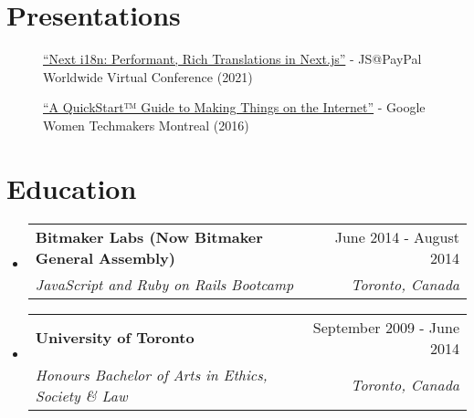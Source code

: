 \documentclass[letterpaper,10.8pt]{article}
\makeatletter
\newcommand{\education}[4]{
  \vspace{0pt}\item[]
    \begin{tabular*}{1\textwidth}{l@{\extracolsep{\fill}}r}
      \textbf{#1} & #2 \\
      \textit{\small#3} & \textit{\small #4} \\
    \end{tabular*}\vspace{-4pt}
}
\newcommand{\educationStart}{\begin{itemize}[leftmargin=0pt]}
\newcommand{\resumeSubHeadingListEnd}{\end{itemize}}
\makeatother
\begin{document}

\section{Presentations}
\begin{description}
\item[] {\href{https://youtu.be/tq9MfIG-VXw?t=14526}{“Next i18n: Performant, Rich Translations in Next.js”} - JS@PayPal Worldwide Virtual Conference (2021)}
\item[] {\href{https://www.youtube.com/watch?v=6EHbfAmA_0c}{“A QuickStart™ Guide to Making Things on the Internet”} - Google Women Techmakers Montreal (2016)}
\end{description}

\section{Education}
  \educationStart
    \education
      {Bitmaker Labs (Now Bitmaker General Assembly)}{June 2014 - August 2014}
      {JavaScript and Ruby on Rails Bootcamp}{Toronto, Canada}
    \education
      {University of Toronto}{September 2009 - June 2014}
      {Honours Bachelor of Arts in Ethics, Society \& Law}{Toronto, Canada}
    \vspace{-4px}
  \resumeSubHeadingListEnd



\end{document}
